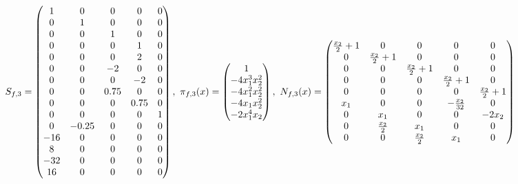 \documentclass[fleqn]{article}
\begin{document}
\begin{align}
    S_{f,3} = \pmqty{ 1 & 0 & 0 & 0 & 0 \\ 0 & 1 & 0 & 0 & 0 \\ 0 & 0 & 1 & 0 & 0 \\ 0 & 0 & 0 & 1 & 0 \\ 0 & 0 & 0 & 2 & 0 \\ 0 & 0 & -2 & 0 & 0 \\ 0 & 0 & 0 & -2 & 0 \\ 0 & 0 & 0.75 & 0 & 0 \\ 0 & 0 & 0 & 0.75 & 0 \\ 0 & 0 & 0 & 0 & 1 \\ 0 & -0.25 & 0 & 0 & 0 \\ -16 & 0 & 0 & 0 & 0 \\ 8 & 0 & 0 & 0 & 0 \\ -32 & 0 & 0 & 0 & 0 \\ 16 & 0 & 0 & 0 & 0 }
    ,~
    \pi_{f,3}(x) = \pmqty{
        1                \\
        -4x_{1}^3x_{2}^2 \\
        -4x_{1}^2x_{2}^2 \\
        -4x_{1}x_{2}^2   \\
        -2x_{1}^4x_{2}   \\
    }
    ,~
    N_{f,3}(x) = \pmqty{
        \frac{x_{2}}{2}+1 & 0                 & 0                 & 0                 & 0                 \\
        0                 & \frac{x_{2}}{2}+1 & 0                 & 0                 & 0                 \\
        0                 & 0                 & \frac{x_{2}}{2}+1 & 0                 & 0                 \\
        0                 & 0                 & 0                 & \frac{x_{2}}{2}+1 & 0                 \\
        0                 & 0                 & 0                 & 0                 & \frac{x_{2}}{2}+1 \\
        x_{1}             & 0                 & 0                 & -\frac{x_{2}}{32} & 0                 \\
        0                 & x_{1}             & 0                 & 0                 & -2x_{2}           \\
        0                 & \frac{x_{2}}{2}   & x_{1}             & 0                 & 0                 \\
        0                 & 0                 & \frac{x_{2}}{2}   & x_{1}             & 0                 \\
    }
\end{align}
\end{document}
